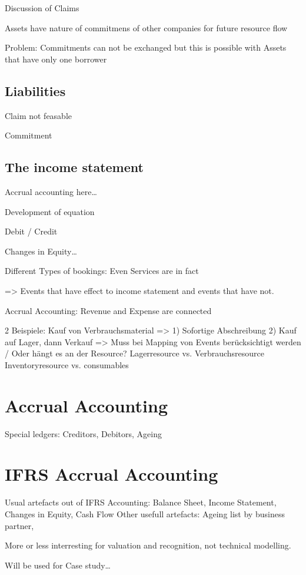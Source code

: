 Discussion of Claims

Assets have nature of commitmens of other companies for future resource flow

Problem: Commitments can not be exchanged but this is possible with Assets that have only one borrower

\subsection{Liabilities}
Claim not feasable

Commitment

\subsection{The income statement}
Accrual accounting here\ldots

Development of equation

Debit / Credit

Changes in Equity\ldots

Different Types of bookings:
Even Services are in fact

=> Events that have effect to income statement and events that have not.

Accrual Accounting: Revenue and Expense are connected

2 Beispiele: Kauf von Verbrauchsmaterial => 1) Sofortige Abschreibung 2) Kauf auf Lager, dann Verkauf => Muss bei Mapping von Events berücksichtigt werden / Oder hängt es an der Resource? Lagerresource vs. Verbrauchsresource Inventoryresource vs. consumables

\section{Accrual Accounting}
Special ledgers: Creditors, Debitors, Ageing




\section{IFRS Accrual Accounting}
Usual artefacts out of IFRS Accounting: Balance Sheet, Income Statement, Changes in Equity, Cash Flow
Other usefull artefacts: Ageing list by business partner,


More or less interresting for valuation and recognition, not technical
modelling.

Will be used for Case study\ldots




